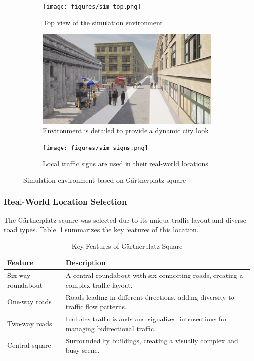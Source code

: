 \begin{figure}[h]
    \centering
    \begin{subfigure}{\textwidth}
        \centering
        \texttt{[image: figures/sim\_top.png]}
        \caption{Top view of the simulation environment}
        \label{fig:sim_top}
    \end{subfigure}
    \begin{subfigure}{\textwidth}
        \centering
        \includegraphics[width=\textwidth, trim=0 200pt 0 200pt, clip]{figures/sim_crowd.png}
        \caption{Environment is detailed to provide a dynamic city look}
        \label{fig:sim_crowd}
    \end{subfigure}
    \begin{subfigure}{\textwidth}
        \centering
        \texttt{[image: figures/sim\_signs.png]}
        \caption{Local traffic signs are used in their real-world locations}
        \label{fig:sim_signs}
    \end{subfigure}
    \caption{Simulation environment based on Gärtnerplatz square}
    \label{fig:simulation}
\end{figure}
\FloatBarrier
\subsubsection*{Real-World Location Selection}
The Gärtnerplatz square was selected due to its unique traffic layout and diverse road types. Table~\ref{table:gaertnerplatz_features} summarizes the key features of this location.

\begin{table}[h!]
\centering
\begin{tabular}{@{}p{4cm}p{10cm}@{}}
\toprule
\textbf{Feature} & \textbf{Description} \\
\midrule
Six-way roundabout & A central roundabout with six connecting roads, creating a complex traffic layout. \\
\midrule
One-way roads & Roads leading in different directions, adding diversity to traffic flow patterns. \\
\midrule
Two-way roads & Includes traffic islands and signalized intersections for managing bidirectional traffic. \\
\midrule
Central square & Surrounded by buildings, creating a visually complex and busy scene. \\
\bottomrule
\end{tabular}
\caption{Key Features of Gärtnerplatz Square}
\label{table:gaertnerplatz_features}
\end{table}

